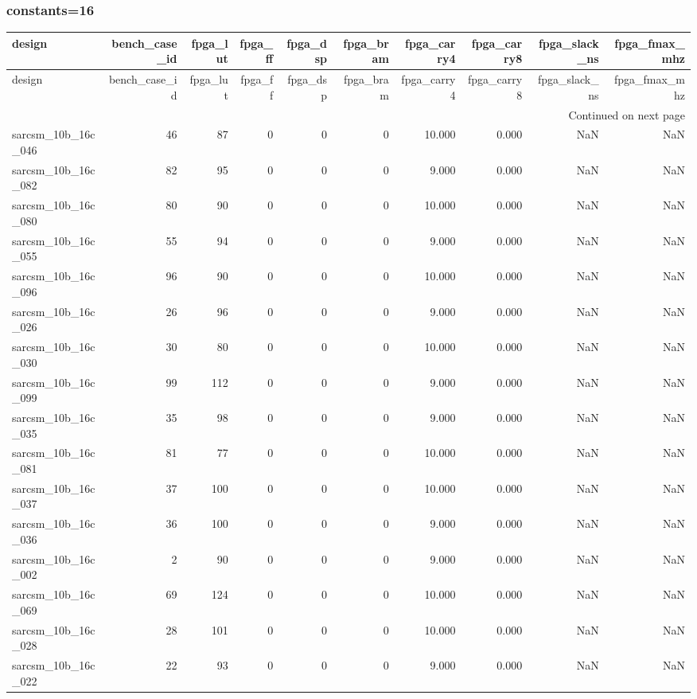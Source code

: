 \documentclass{article}
\begin{document}
\subsubsection*{constants=16}
\begin{longtable}{lrrrrrrrrr}
\toprule
design & bench\_case\_id & fpga\_lut & fpga\_ff & fpga\_dsp & fpga\_bram & fpga\_carry4 & fpga\_carry8 & fpga\_slack\_ns & fpga\_fmax\_mhz \\
\midrule
\endfirsthead
\toprule
design & bench\_case\_id & fpga\_lut & fpga\_ff & fpga\_dsp & fpga\_bram & fpga\_carry4 & fpga\_carry8 & fpga\_slack\_ns & fpga\_fmax\_mhz \\
\midrule
\endhead
\midrule
\multicolumn{10}{r}{Continued on next page} \\
\midrule
\endfoot
\bottomrule
\endlastfoot
sarcsm\_10b\_16c\_046 & 46 & 87 & 0 & 0 & 0 & 10.000 & 0.000 & NaN & NaN \\
sarcsm\_10b\_16c\_082 & 82 & 95 & 0 & 0 & 0 & 9.000 & 0.000 & NaN & NaN \\
sarcsm\_10b\_16c\_080 & 80 & 90 & 0 & 0 & 0 & 10.000 & 0.000 & NaN & NaN \\
sarcsm\_10b\_16c\_055 & 55 & 94 & 0 & 0 & 0 & 9.000 & 0.000 & NaN & NaN \\
sarcsm\_10b\_16c\_096 & 96 & 90 & 0 & 0 & 0 & 10.000 & 0.000 & NaN & NaN \\
sarcsm\_10b\_16c\_026 & 26 & 96 & 0 & 0 & 0 & 9.000 & 0.000 & NaN & NaN \\
sarcsm\_10b\_16c\_030 & 30 & 80 & 0 & 0 & 0 & 10.000 & 0.000 & NaN & NaN \\
sarcsm\_10b\_16c\_099 & 99 & 112 & 0 & 0 & 0 & 9.000 & 0.000 & NaN & NaN \\
sarcsm\_10b\_16c\_035 & 35 & 98 & 0 & 0 & 0 & 9.000 & 0.000 & NaN & NaN \\
sarcsm\_10b\_16c\_081 & 81 & 77 & 0 & 0 & 0 & 10.000 & 0.000 & NaN & NaN \\
sarcsm\_10b\_16c\_037 & 37 & 100 & 0 & 0 & 0 & 10.000 & 0.000 & NaN & NaN \\
sarcsm\_10b\_16c\_036 & 36 & 100 & 0 & 0 & 0 & 9.000 & 0.000 & NaN & NaN \\
sarcsm\_10b\_16c\_002 & 2 & 90 & 0 & 0 & 0 & 9.000 & 0.000 & NaN & NaN \\
sarcsm\_10b\_16c\_069 & 69 & 124 & 0 & 0 & 0 & 10.000 & 0.000 & NaN & NaN \\
sarcsm\_10b\_16c\_028 & 28 & 101 & 0 & 0 & 0 & 10.000 & 0.000 & NaN & NaN \\
sarcsm\_10b\_16c\_022 & 22 & 93 & 0 & 0 & 0 & 9.000 & 0.000 & NaN & NaN \\

\end{longtable}
\end{document}
